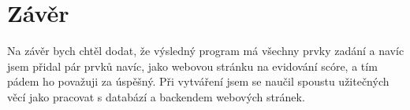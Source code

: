 \section{Závěr}
Na závěr bych chtěl dodat, že výsledný program má všechny prvky zadání a navíc jsem přidal pár prvků navíc, jako webovou stránku na evidování scóre, a tím pádem ho považuji za úspěšný. Při vytváření jsem se naučil spoustu užitečných věcí jako pracovat s databází a backendem webových stránek.